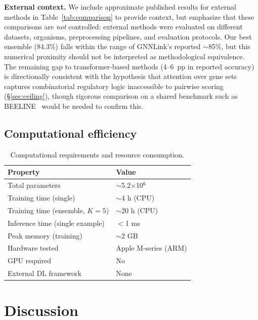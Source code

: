 \documentclass[10pt,twocolumn]{article}
\begin{document}
\textbf{External context.}
We include approximate published results for external methods in Table~\ref{tab:comparison} to provide context, but emphasize that these comparisons are \textit{not} controlled: external methods were evaluated on different datasets, organisms, preprocessing pipelines, and evaluation protocols.
Our best ensemble (84.3\%) falls within the range of GNNLink's reported ${\sim}$85\%, but this numerical proximity should not be interpreted as methodological equivalence.
The remaining gap to transformer-based methods (4--6~pp in reported accuracy) is directionally consistent with the hypothesis that attention over gene sets captures combinatorial regulatory logic inaccessible to pairwise scoring (\S\ref{sec:ceiling}), though rigorous comparison on a shared benchmark such as BEELINE~\cite{pratapa2020benchmarking} would be needed to confirm this.

\subsection{Computational efficiency}
\label{sec:compute}

\begin{table}[!htbp]
\centering
\caption{Computational requirements and resource consumption.}
\label{tab:compute}
\small
\begin{tabular}{@{}ll@{}}
\toprule
\textbf{Property} & \textbf{Value} \\
\midrule
Total parameters & $\sim$5.2$\times$10$^6$ \\
Training time (single) & $\sim$4 h (CPU) \\
Training time (ensemble, $K{=}5$) & $\sim$20 h (CPU) \\
Inference time (single example) & $<$1 ms \\
Peak memory (training) & $\sim$2 GB \\
Hardware tested & Apple M-series (ARM) \\
GPU required & No \\
External DL framework & None \\
\bottomrule
\end{tabular}
\end{table}

\section{Discussion}
\label{sec:discussion}
\end{document}
